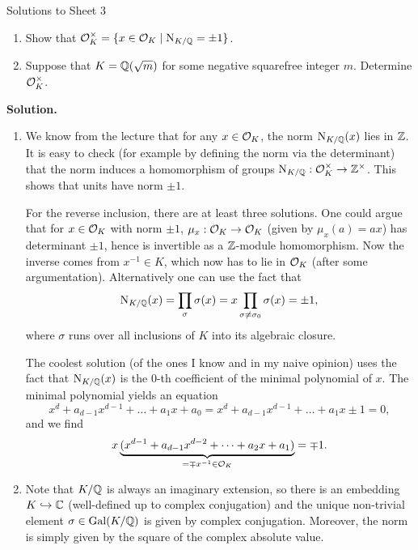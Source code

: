 \documentclass[a4paper,11pt]{article}
\begin{document}
\begin{center}
    \huge{Solutions to Sheet 3}
\end{center}

\begin{enumerate}
    \item Show that $\mathcal{O}_K^\times = \{x \in \mathcal{O}_K \mid \operatorname{N}_{K/\mathbb{Q}} = \pm 1\}$.
    \item Suppose that $K = \mathbb{Q}(\sqrt m)$ for some negative squarefree integer
        $m$. Determine $\mathcal{O}_K^\times$. 
\end{enumerate}

\textbf{Solution.}
\begin{enumerate}[wide, labelindent=0pt]
    \item We know from the lecture that for any $x \in \mathcal{O}_K$, the norm
        $\operatorname{N}_{K/\mathbb{Q}}(x)$ lies in $\mathbb{Z}$. It is easy to check (for example by 
        defining the norm via the determinant) that the norm induces a
        homomorphism of groups $\operatorname{N}_{K/\mathbb{Q}}: \mathcal{O}_K^\times \to \mathbb{Z}^\times$.
        This shows that units have norm $\pm 1$. 

        For the reverse inclusion, there are at least three solutions. 
        One could argue that for $x \in \mathcal{O}_K$ with norm $\pm 1$, $\mu_x: \mathcal{O}_K
        \to \mathcal{O}_K$ (given by $\mu_x(a) = ax$) has determinant $\pm 1$, hence is
        invertible as a $\mathbb{Z}$-module homomorphism. Now the inverse comes from
        $x^{-1} \in K$, which now has to lie in $\mathcal{O}_K$ (after some
        argumentation). Alternatively one can use the fact that $$\operatorname{N}_{K/\mathbb{Q}}(x) =
        \prod_\sigma \sigma(x) = x \prod_{\sigma \neq \sigma_0} \sigma(x) = \pm
        1,$$ where $\sigma$ runs over all inclusions of $K$ into its algebraic
        closure. 

        The coolest solution (of the ones I know and in my naive opinion) uses the fact that
        $\operatorname{N}_{K/\mathbb{Q}}(x)$ is the $0$-th coefficient of the minimal polynomial of
        $x$. The minimal polynomial yields an equation
        \begin{equation*}
            x^d + a_{d-1}x^{d-1} + \dots + a_1 x + a_0 = x^d + a_{d-1}x^{d-1} + \dots + a_1 x \pm 1 = 0,
        \end{equation*}
        and we find
        \begin{equation*}
            x\underbrace{(x^{d-1} + a_{d-1}x^{d-2} + \dots + a_2 x + a_1)}_{= \mp x^{-1} \in \mathcal{O}_K} = \mp 1.
        \end{equation*}
    \item 
        Note that $K/\mathbb{Q}$ is always an imaginary extension, so there is an
        embedding $K \hookrightarrow \mathbb{C}$ (well-defined up to complex conjugation) and
        the unique non-trivial element $\sigma \in \operatorname{Gal}(K/\mathbb{Q})$ is given by
        complex conjugation. Moreover, the norm is simply given by the square
        of the complex absolute value.


\end{enumerate}
\end{document}
